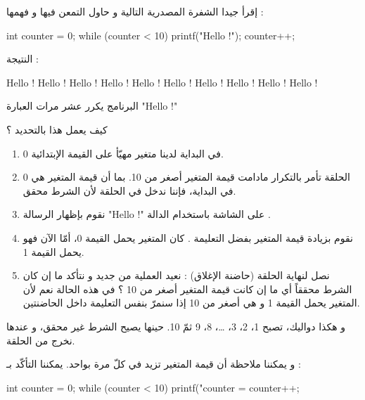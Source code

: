 إقرأ جيدا الشفرة المصدرية التالية و حاول التمعن فيها و فهمها :

\begin{Csource}
int counter = 0;
while (counter < 10)
{
	printf("Hello !\n");
	counter++;
}
\end{Csource}

النتيجة :

\begin{Csource}
Hello !
Hello !
Hello !
Hello !
Hello !
Hello !
Hello !
Hello !
Hello !
Hello !
\end{Csource}

البرنامج يكرر عشر مرات العبارة
"\textenglish{Hello !}"

\begin{question}
كيف يعمل هذا بالتحديد ؟
\end{question}

\begin{enumerate}
	\item في البداية لدينا متغير 
	مهيّأ على القيمة الإبتدائية 0.
	\item الحلقة 
تأمر بالتكرار مادامت قيمة المتغير
أصغر من 10. بما أن قيمة المتغير 
هي 0 في البداية، فإننا ندخل في الحلقة لأن الشرط محقق.
	\item نقوم بإظهار الرسالة 
	"\textenglish{Hello !}"
على الشاشة باستخدام الدالة 
.
	\item نقوم بزيادة قيمة المتغير 
بفضل التعليمة 
	.
كان المتغير
يحمل القيمة 0، أمّا الآن فهو يحمل القيمة 1.
	\item نصل لنهاية الحلقة (حاضنة الإغلاق) : نعيد العملية من جديد و نتأكد ما إن كان الشرط محققاً أي ما إن كانت قيمة المتغير أصغر من 10 ؟ في هذه الحالة نعم لأن المتغير
	يحمل القيمة 1 و هي أصغر من 10 إذا سنمرّ بنفس التعليمة داخل الحاضنتين.
\end{enumerate}

و هكذا دواليك،
تصبح 1، 2، 3، \dots، 8، 9 ثمّ 10. حينها يصيح الشرط 
غير محقق، و عندها نخرج من الحلقة.

و يمكننا ملاحظة أن قيمة المتغير
 تزيد في كلّ مرة بواحد. يمكننا التأكّد بـ :

\begin{Csource}
int counter = 0;
while (counter < 10)
{
	printf("counter = %
	counter++;
}
\end{Csource}

